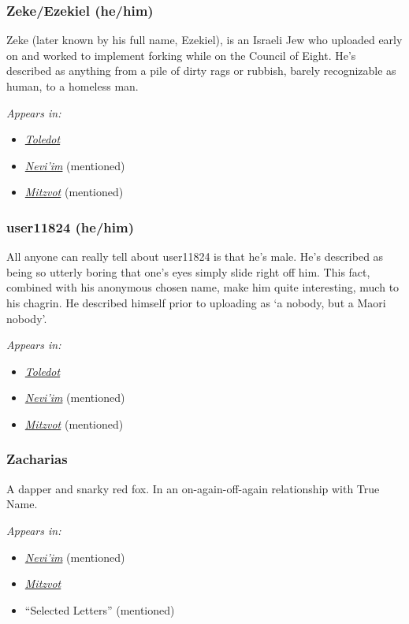 \subsubsection{Zeke/Ezekiel (he/him)}

Zeke (later known by his full name, Ezekiel), is an Israeli Jew who uploaded early on and worked to implement forking while on the Council of Eight. He's described as anything from a pile of dirty rags or rubbish, barely recognizable as human, to a homeless man.

\emph{Appears in:}

\begin{itemize}
\tightlist
\item
  \href{https://toledot.post-self.ink}{\emph{Toledot}}
\item
  \href{https://neviim.post-self.ink}{\emph{Nevi'im}} (mentioned)
\item
  \href{https://mitzvot.post-self.ink}{\emph{Mitzvot}} (mentioned)
\end{itemize}

\subsubsection{user11824 (he/him)}

All anyone can really tell about user11824 is that he's male. He's described as being so utterly boring that one's eyes simply slide right off him. This fact, combined with his anonymous chosen name, make him quite interesting, much to his chagrin. He described himself prior to uploading as `a nobody, but a Maori nobody'.

\emph{Appears in:}

\begin{itemize}
\tightlist
\item
  \href{https://toledot.post-self.ink}{\emph{Toledot}}
\item
  \href{https://neviim.post-self.ink}{\emph{Nevi'im}} (mentioned)
\item
  \href{https://mitzvot.post-self.ink}{\emph{Mitzvot}} (mentioned)
\end{itemize}

\subsubsection{Zacharias}

A dapper and snarky red fox. In an on-again-off-again relationship with True Name.

\emph{Appears in:}

\begin{itemize}
\tightlist
\item
  \href{https://neviim.post-self.ink}{\emph{Nevi'im}} (mentioned)
\item
  \href{https://mitzvot.post-self.ink}{\emph{Mitzvot}}
\item
  ``Selected Letters'' (mentioned)
\end{itemize}
